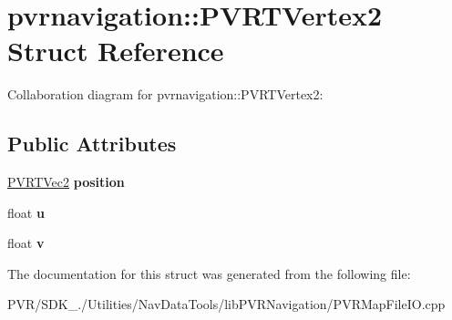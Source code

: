 \hypertarget{structpvrnavigation_1_1_p_v_r_t_vertex2}{\section{pvrnavigation\+:\+:P\+V\+R\+T\+Vertex2 Struct Reference}
\label{structpvrnavigation_1_1_p_v_r_t_vertex2}
}


Collaboration diagram for pvrnavigation\+:\+:P\+V\+R\+T\+Vertex2\+:
\subsection*{Public Attributes}
\begin{DoxyCompactItemize}
\item 
\hypertarget{structpvrnavigation_1_1_p_v_r_t_vertex2_a3e381a3aa27df3188287c1c755f0625a}{\hyperlink{struct_p_v_r_t_vec2}{P\+V\+R\+T\+Vec2} {\bfseries position}}\label{structpvrnavigation_1_1_p_v_r_t_vertex2_a3e381a3aa27df3188287c1c755f0625a}

\item 
\hypertarget{structpvrnavigation_1_1_p_v_r_t_vertex2_a3cd1f0b8d8ce8cbf68951f4e13e8dc46}{float {\bfseries u}}\label{structpvrnavigation_1_1_p_v_r_t_vertex2_a3cd1f0b8d8ce8cbf68951f4e13e8dc46}

\item 
\hypertarget{structpvrnavigation_1_1_p_v_r_t_vertex2_a04729a8b4adea526a79e9082d111ab9b}{float {\bfseries v}}\label{structpvrnavigation_1_1_p_v_r_t_vertex2_a04729a8b4adea526a79e9082d111ab9b}

\end{DoxyCompactItemize}


The documentation for this struct was generated from the following file\+:\begin{DoxyCompactItemize}
\item 
P\+V\+R/\+S\+D\+K\+\_./\+Utilities/\+Nav\+Data\+Tools/lib\+P\+V\+R\+Navigation/P\+V\+R\+Map\+File\+I\+O.\+cpp\end{DoxyCompactItemize}
